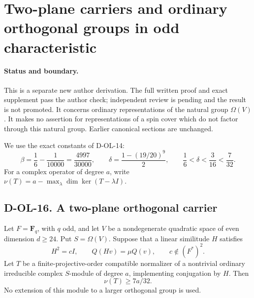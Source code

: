 \section{Two-plane carriers and ordinary orthogonal groups in odd characteristic}
\label{sec:orthogonal-even-odd}

\paragraph{Status and boundary.}
This is a separate new author derivation.  The full written proof
and exact supplement pass the author check; independent review
is pending and the result is not promoted.  It concerns
ordinary representations of the natural group $\Omega(V)$.  It makes
no assertion for representations of a spin cover which do not factor
through this natural group.  Earlier canonical sections are unchanged.

We use the exact constants of D-OL-14:
\[
 \beta=\frac16-\frac1{10000}=\frac{4997}{30000},\qquad
 \delta=\frac{1-(19/20)^9}{2},\qquad
 \frac16<\delta<\frac3{16}<\frac7{32}.
 \tag{OE.1}
\]
For a complex operator of degree $a$, write
$\nu(T)=a-\max_\lambda\dim\ker(T-\lambda I)$.

\subsection*{D-OL-16. A two-plane orthogonal carrier}

\begin{lemma}[D-OL-16]
Let $F=\mathbf F_q$, with $q$ odd, and let $V$ be a nondegenerate
quadratic space of even dimension $d\ge24$.  Put $S=\Omega(V)$.
Suppose that a linear similitude $H$ satisfies
\[
       H^2=cI,\qquad Q(Hv)=\mu Q(v),\qquad
       c\notin(F^*)^2.
       \tag{OE.2}
\]
Let $T$ be a finite-projective-order compatible normalizer of a
nontrivial ordinary irreducible complex $S$-module of degree $a$,
implementing conjugation by $H$.  Then
\[
                              \nu(T)\ge7a/32.
                              \tag{OE.3}
\]
No extension of this module to a larger orthogonal group is used.
\end{lemma}

